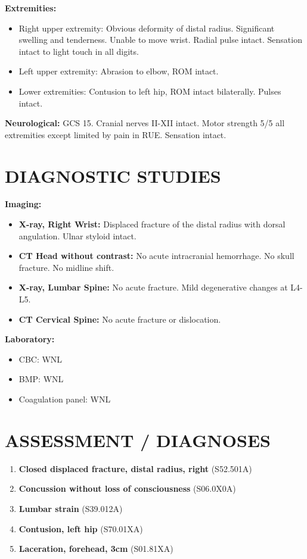 \documentclass[11pt]{article}
\begin{document}
\textbf{Extremities:}
\begin{itemize}[nosep]
\item Right upper extremity: Obvious deformity of distal radius. Significant swelling and tenderness. Unable to move wrist. Radial pulse intact. Sensation intact to light touch in all digits.
\item Left upper extremity: Abrasion to elbow, ROM intact.
\item Lower extremities: Contusion to left hip, ROM intact bilaterally. Pulses intact.
\end{itemize}

\textbf{Neurological:} GCS 15. Cranial nerves II-XII intact. Motor strength 5/5 all extremities except limited by pain in RUE. Sensation intact.

\section*{DIAGNOSTIC STUDIES}

\textbf{Imaging:}
\begin{itemize}[nosep]
\item \textbf{X-ray, Right Wrist:} Displaced fracture of the distal radius with dorsal angulation. Ulnar styloid intact.
\item \textbf{CT Head without contrast:} No acute intracranial hemorrhage. No skull fracture. No midline shift.
\item \textbf{X-ray, Lumbar Spine:} No acute fracture. Mild degenerative changes at L4-L5.
\item \textbf{CT Cervical Spine:} No acute fracture or dislocation.
\end{itemize}

\textbf{Laboratory:}
\begin{itemize}[nosep]
\item CBC: WNL
\item BMP: WNL
\item Coagulation panel: WNL
\end{itemize}

\section*{ASSESSMENT / DIAGNOSES}

\begin{enumerate}
\item \textbf{Closed displaced fracture, distal radius, right} (S52.501A)
\item \textbf{Concussion without loss of consciousness} (S06.0X0A)
\item \textbf{Lumbar strain} (S39.012A)
\item \textbf{Contusion, left hip} (S70.01XA)
\item \textbf{Laceration, forehead, 3cm} (S01.81XA)
\end{enumerate}
\end{document}
